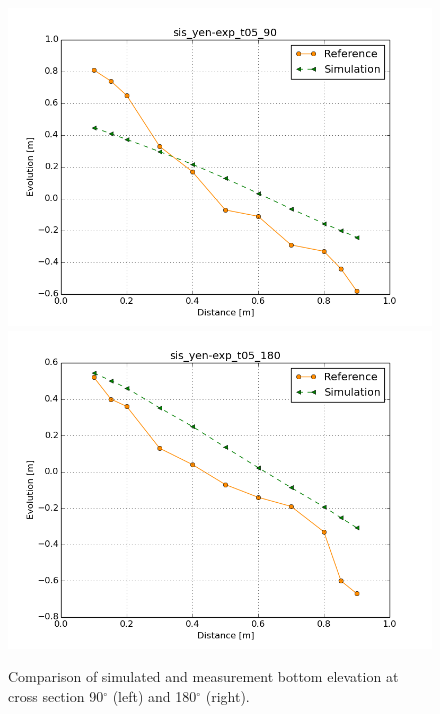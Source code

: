 \begin{figure} [!h]
\centering
\includegraphics[scale=0.25]{img/sis_yen-exp_90.png}
\includegraphics[scale=0.25]{img/sis_yen-exp_180.png}
 \caption{Comparison of simulated and measurement bottom elevation at cross section 90$^{\circ}$ (left) and 180$^{\circ}$ (right).}\label{fig:results2}
\end{figure}
